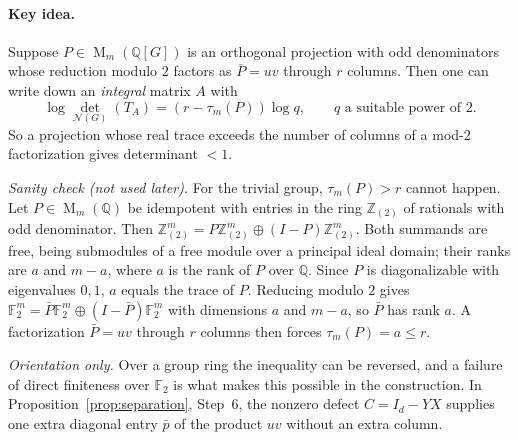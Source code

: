 \documentclass[11pt]{article}
\theoremstyle{remark}
\numberwithin{equation}{section}
\newcommand{\F}{\mathbb F}
\newcommand{\Z}{\mathbb Z}
\newcommand{\Q}{\mathbb Q}
\newcommand{\Mat}{\operatorname{M}}
\newcommand{\N}{\mathcal N}
\begin{document}
\paragraph{Key idea.}
Suppose $P\in\Mat_m(\Q[G])$ is an orthogonal projection with odd denominators whose reduction modulo $2$ factors as $\bar P=uv$ through $r$ columns. Then one can write down an \emph{integral} matrix $A$ with
\[
 \log\det_{\N(G)}(T_A)=(r-\tau_m(P))\log q,\qquad q\text{ a suitable power of }2 .
\]
So a projection whose real trace exceeds the number of columns of a mod-$2$ factorization gives determinant $<1$.

\emph{Sanity check (not used later).} For the trivial group, $\tau_m(P)>r$ cannot happen. Let $P\in\Mat_m(\Q)$ be idempotent with entries in the ring $\Z_{(2)}$ of rationals with odd denominator. Then $\Z_{(2)}^m=P\Z_{(2)}^m\oplus(I-P)\Z_{(2)}^m$. Both summands are free, being submodules of a free module over a principal ideal domain; their ranks are $a$ and $m-a$, where $a$ is the rank of $P$ over $\Q$. Since $P$ is diagonalizable with eigenvalues $0,1$, $a$ equals the trace of $P$. Reducing modulo $2$ gives $\F_2^m=\bar P\F_2^m\oplus(I-\bar P)\F_2^m$ with dimensions $a$ and $m-a$, so $\bar P$ has rank $a$. A factorization $\bar P=uv$ through $r$ columns then forces $\tau_m(P)=a\le r$.

\emph{Orientation only.} Over a group ring the inequality can be reversed, and a failure of direct finiteness over $\F_2$ is what makes this possible in the construction. In Proposition~\ref{prop:separation}, Step~6, the nonzero defect $C=I_d-YX$ supplies one extra diagonal entry $\bar p$ of the product $uv$ without an extra column.
\end{document}
